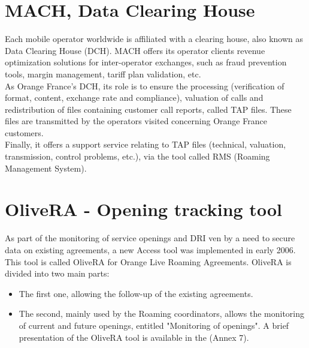 \section{MACH, Data Clearing House}

\-\hspace{0.5cm} Each mobile operator worldwide is affiliated with a clearing house, also known as Data Clearing House (\acs{DCH}). MACH offers its operator clients revenue optimization solutions for inter-operator exchanges, such as fraud prevention tools, margin management, tariff plan validation, etc.\\

As Orange France's \acs{DCH}, its role is to ensure the processing (verification of format, content, exchange rate and compliance), valuation of calls and redistribution of files containing customer call reports, called \acs{TAP} files. These files are transmitted by the operators visited concerning Orange France customers.\\

Finally, it offers a support service relating to \acs{TAP} files (technical, valuation, transmission, control problems, etc.), via the tool called \acs{RMS} (Roaming Management System).\\

\section{\acs{OliveRA} - Opening tracking tool}

\-\hspace{0.5cm} As part of the monitoring of service openings and \acs{DRI} ven by a need to secure data on existing agreements, a new Access tool was implemented in early 2006. This tool is called \acs{OliveRA} for Orange Live Roaming Agreements. \acs{OliveRA} is divided into two main parts:
\begin{itemize}
    \item The first one, allowing the follow-up of the existing agreements. 
    \item The second, mainly used by the Roaming coordinators, allows the monitoring of current and future openings, entitled "Monitoring of openings". A brief presentation of the \acs{OliveRA} tool is available in the (Annex 7). 
\end{itemize}



